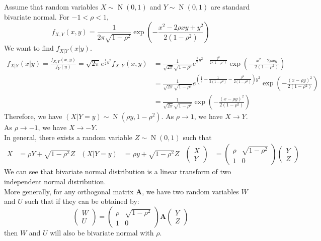 \documentclass{huhtakm-template-book}
\DeclareMathOperator{\N}{N}
\begin{document}
\begin{eg}
	Assume that random variables $X\sim\N(0,1)$ and $Y\sim\N(0,1)$ are standard bivariate normal. For $-1<\rho<1$,
	\begin{equation*}
		f_{X,Y}(x,y)=\frac{1}{2\pi\sqrt{1-\rho^{2}}}\exp\left(-\frac{x^{2}-2\rho xy+y^{2}}{2(1-\rho^{2})}\right)
	\end{equation*}
	We want to find $f_{X|Y}(x|y)$.
	\begin{align*}
		f_{X|Y}(x|y)=\frac{f_{X,Y}(x,y)}{f_{Y}(y)}=\sqrt{2\pi}e^{\frac{1}{2}y^{2}}f_{X,Y}(x,y)&=\frac{1}{\sqrt{2\pi}\sqrt{1-\rho^{2}}}e^{\frac{1}{2}y^{2}-\frac{y^{2}}{2(1-\rho^{2})}}\exp\left(-\frac{x^{2}-2\rho xy}{2(1-\rho^{2})}\right)\\
		&=\frac{1}{\sqrt{2\pi}{\sqrt{1-\rho^{2}}}}e^{\left(\frac{1}{2}-\frac{1}{2(1-\rho^{2})}-\frac{\rho^{2}}{2(1-\rho^{2})}\right)y^{2}}\exp\left(-\frac{(x-\rho y)^{2}}{2(1-\rho^{2})}\right)\\
		&=\frac{1}{\sqrt{2\pi}\sqrt{1-\rho^{2}}}\exp\left(-\frac{(x-\rho y)^{2}}{2(1-\rho^{2})}\right)
	\end{align*}
	Therefore, we have $(X|Y=y)\sim\N(\rho y,1-\rho^{2})$. As $\rho\to 1$, we have $X\to Y$. As $\rho\to -1$, we have $X\to -Y$.\\
	In general, there exists a random variable $Z\sim\N(0,1)$ such that
	\begin{align*}
		X&=\rho Y+\sqrt{1-\rho^{2}}Z & (X|Y=y)&=\rho y+\sqrt{1-\rho^{2}}Z & \begin{pmatrix}
			X\\
			Y
		\end{pmatrix}&=\begin{pmatrix}
			\rho & \sqrt{1-\rho^{2}}\\
			1 & 0
		\end{pmatrix}\begin{pmatrix}
			Y\\
			Z
		\end{pmatrix}
	\end{align*}
	We can see that bivariate normal distribution is a linear transform of two independent normal distribution.\\
	More generally, for any orthogonal matrix $\mathbf{A}$, we have two random variables $W$ and $U$ such that if they can be obtained by:
	\begin{equation*}
		\begin{pmatrix}
			W\\
			U
		\end{pmatrix}=\begin{pmatrix}
			\rho & \sqrt{1-\rho^{2}}\\
			1 & 0
		\end{pmatrix}\mathbf{A}\begin{pmatrix}
			Y\\
			Z
		\end{pmatrix}
	\end{equation*}
	then $W$ and $U$ will also be bivariate normal with $\rho$.
\end{eg}
\end{document}
